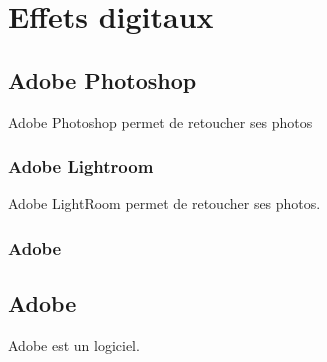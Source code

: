 \documentclass{article}
\begin{document}
\section{Effets digitaux}
\subsection{Adobe Photoshop}
Adobe Photoshop permet de retoucher ses photos

\subsubsection{Adobe Lightroom}
Adobe LightRoom permet de retoucher ses photos.
\subsubsection{Adobe}

\subsection{Adobe}
Adobe est un logiciel.
\end{document}
